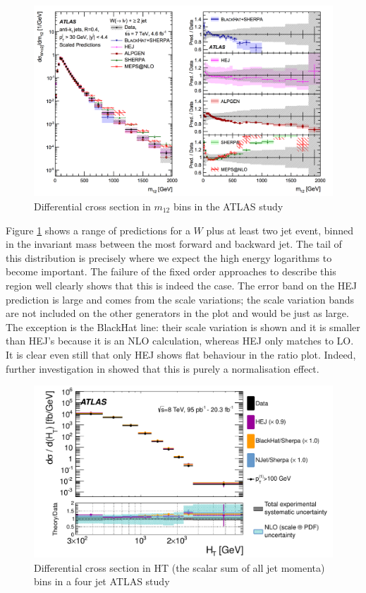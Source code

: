 \begin{figure}[t]
\centering
\includegraphics[scale=0.4]{Images/wjets_HEJ.png} 
\caption{Differential cross section in $m_{12}$ bins in the ATLAS study \cite{Aad2014a}}
\label{fig:wjet}
\end{figure} 

Figure \ref{fig:wjet} shows a range of predictions for a $W$ plus at least two jet event, binned in the invariant mass between the most forward and backward jet. The tail of this distribution is precisely where we expect the high energy logarithms to become important. The failure of the fixed order approaches to describe this region well clearly shows that this is indeed the case. The error band on the HEJ prediction is large and comes from the scale variations; the scale variation bands are not included on the other generators in the plot and would be just as large. The exception is the BlackHat line: their scale variation is shown and it is smaller than HEJ's because it is an NLO calculation, whereas HEJ only matches to LO. It is clear even still that only HEJ shows flat behaviour in the ratio plot. Indeed, further investigation in \cite{Andersen2016} showed that this is purely a normalisation effect. 

\begin{figure}[t]
\centering
\includegraphics[scale=0.8]{Images/4jet_hej.pdf} 
\caption{Differential cross section in HT (the scalar sum of all jet momenta) bins in a four jet ATLAS study \cite{Aad2015}}
\label{fig:4jetan}
\end{figure}


